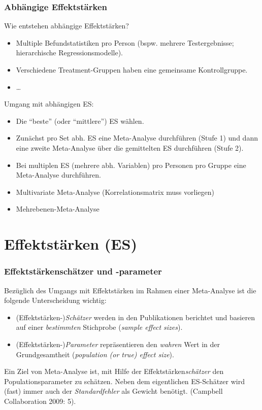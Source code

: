 \begin{frame}[plain]
  \frametitle{Abhängige Effektstärken}\label{slide:abhaeng-es}
  
  \begin{footnotesize}
    Wie entstehen abhängige Effektstärken?
    \begin{itemize}
    \item Multiple Befundstatistiken pro Person (bspw. mehrere Testergebnisse; hierarchische Regressionsmodelle).
    \item Verschiedene Treatment-Gruppen haben eine gemeinsame Kontrollgruppe.
    \item \ldots
    \end{itemize}

    Umgang mit abhängigen ES:
    \begin{itemize}
    \item Die "`beste"' (oder "`mittlere"') ES wählen.
    \item Zunächst pro Set abh. ES eine Meta-Analyse durchführen (Stufe 1) und
      dann eine zweite Meta-Analyse über die gemittelten ES durchführen (Stufe
      2).
    \item Bei multiplen ES (mehrere abh. Variablen) pro Personen pro Gruppe eine
      Meta-Analyse durchführen.
    \item Multivariate Meta-Analyse (Korrelationsmatrix muss vorliegen)
    \item Mehrebenen-Meta-Analyse
    \end{itemize}

    \citep[Quellen: ][]{kim_degree_2010, lambert_meta-analysis_1996,
      raudenbush_modeling_1988, thompson_impact_2013}
  \end{footnotesize}
\end{frame}



\section{Effektstärken (ES)}\label{sec:effectstaerken}

\begin{frame}\frametitle{Effektstärkenschätzer und -parameter}

  Bezüglich des Umgangs mit Effektstärken im Rahmen einer Meta-Analyse ist die
  folgende Unterscheidung wichtig:
  \begin{itemize}
  \item (Effektstärken-)\emph{Schätzer} werden in den Publikationen berichtet
    und basieren auf einer \emph{bestimmten} Stichprobe (\emph{sample effect
      sizes}).
  \item (Effektstärken-)\emph{Parameter} repräsentieren den \emph{wahren} Wert
    in der Grundgesamtheit (\emph{population (or true) effect size}).
  \end{itemize}

  Ein Ziel von Meta-Analyse ist, mit Hilfe der Effektstärken\emph{schätzer}
  den Populationsparameter zu schätzen. Neben dem eigentlichen ES-Schätzer wird
  (fast) immer auch der \emph{Standardfehler} als Gewicht benötigt.
   (Campbell Collaboration 2009: 5).
\end{frame}


